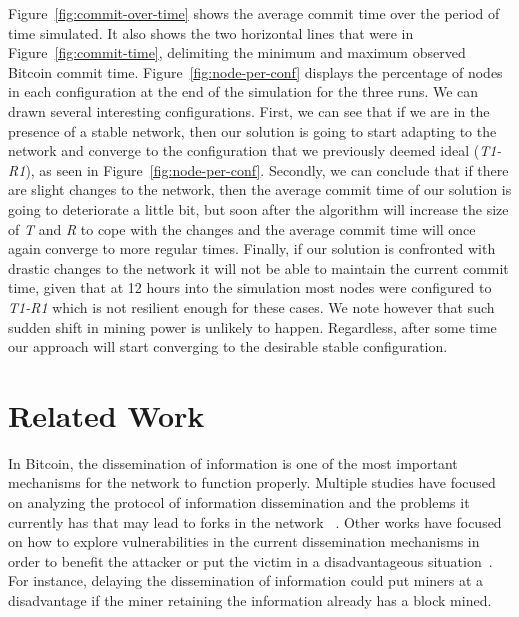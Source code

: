 \documentclass{dads}   %
\begin{document}
Figure~\ref{fig:commit-over-time} shows the average commit time over the period of time simulated. It also shows the two horizontal lines that were in Figure~\ref{fig:commit-time}, delimiting the minimum and maximum observed Bitcoin commit time. Figure~\ref{fig:node-per-conf} displays the percentage of nodes in each configuration at the end of the simulation for the three runs. 
We can drawn several interesting configurations.
First, we can see that if we are in the presence of a stable network, then our solution is going to start adapting to the network and converge to the configuration that we previously deemed ideal (\textsl{T1-R1}), as seen in Figure~\ref{fig:node-per-conf}. Secondly, we can conclude that if there are slight changes to the network, then the average commit time of our solution is going to deteriorate a little bit, but soon after the algorithm will increase the size of \textsl{T} and \textsl{R} to cope with the changes and the average commit time will once again converge to more regular times. Finally, if our solution is confronted with drastic changes to the network it will not be able to maintain the current commit time, given that at 12 hours into the simulation most nodes were configured to \textsl{T1-R1} which is not resilient enough for these cases. 
We note however that such sudden shift in mining power is unlikely to happen.
Regardless, after some time our approach will start converging to the desirable stable configuration.

\section{Related Work}
In Bitcoin, the dissemination of information is one of the most important mechanisms for the network to function properly. Multiple studies have focused on analyzing the protocol of information dissemination and the problems it currently has that may lead to forks in the network ~\cite{decker2013information,croman2016scaling,miller2015discovering}.
Other works have focused on how to explore vulnerabilities in the current dissemination mechanisms in order to benefit the attacker or put the victim in a disadvantageous situation~\cite{apostolaki2016hijacking, sapirshtein2016optimal, eyal2014majority, heilman2015eclipse, bojja2017dandelion}. For instance, delaying the dissemination of information could put miners at a disadvantage if the miner retaining the information already has a block mined.
\end{document}
